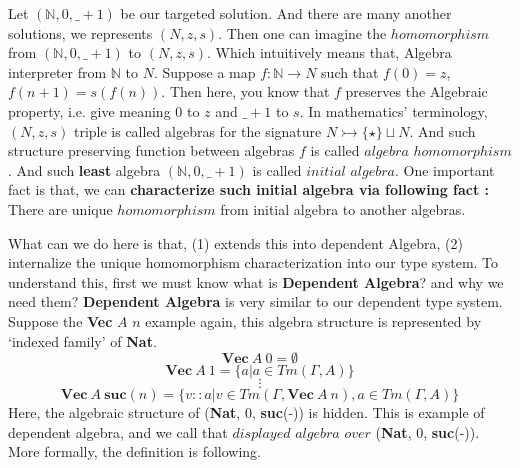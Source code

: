 \documentclass[12pt, a4paper, openany, twoside]{book}
\theoremstyle{definition}
\theoremstyle{remark}
\theoremstyle{plain}
\numberwithin{equation}{section}
\begin{document}
\begin{tcolorbox}[breakable, colback=yellow!10!white,colframe=green!75!black,title=Observation 3.4.3.]\hypertarget{obs 3.4.3.}{}
Let $(\mathbb{N}, 0, \_ + 1)$ be our targeted solution. And there are many another solutions, we represents $(N, z, s)$. 
Then one can imagine the $homomorphism$ from $(\mathbb{N}, 0, \_ + 1)$ to $(N, z, s)$. 
Which intuitively means that, Algebra interpreter from $\mathbb{N}$ to $N$. 
Suppose a map $f : \mathbb{N} \rightarrow N$ such that $f(0) = z$, $f(n + 1) = s(f(n))$. 
Then here, you know that $f$ preserves the Algebraic property, i.e. give meaning $0$ to $z$ and $\_ + 1$ to $s$. 
In mathematics' terminology, $(N, z, s)$ triple is called algebras for the signature $N \rightarrowtail \{\star\} \sqcup N$. And such structure preserving function between algebras $f$ is called $algebra$ $homomorphism$. 
And such \textbf{least} algebra $(\mathbb{N}, 0, \_ + 1)$ is called $initial$ $algebra$. 
One important fact is that, we can \textbf{characterize such initial algebra via following fact : } There are unique $homomorphism$ from initial algebra to another algebras. 
\end{tcolorbox}

\noindent What can we do here is that, (1) extends this into dependent Algebra, (2) internalize the unique homomorphism characterization into our type system. 
To understand this, first we must know what is \textbf{Dependent Algebra}? and why we need them? 
\textbf{Dependent Algebra} is very similar to our dependent type system. Suppose the \textbf{Vec} $A$ $n$ example again, 
this algebra structure is represented by \lq indexed family' of \textbf{Nat}. 
\[\mathbf{Vec}~A~0 = \emptyset\]
\[\mathbf{Vec}~A~1 = \{a | a \in Tm(\Gamma, A)\}\]
\[\vdots\]
\[\mathbf{Vec}~A~\mathbf{suc}(n) = \{v::a | v \in Tm(\Gamma, \mathbf{Vec}~A~n), a \in Tm(\Gamma, A) \}\]
\noindent Here, the algebraic structure of (\textbf{Nat}, 0, \textbf{suc}(-)) is hidden. This is example of dependent algebra, 
and we call that $displayed$ $algebra$ $over$ (\textbf{Nat}, 0, \textbf{suc}(-)). More formally, 
the definition is following. 
\end{document}
